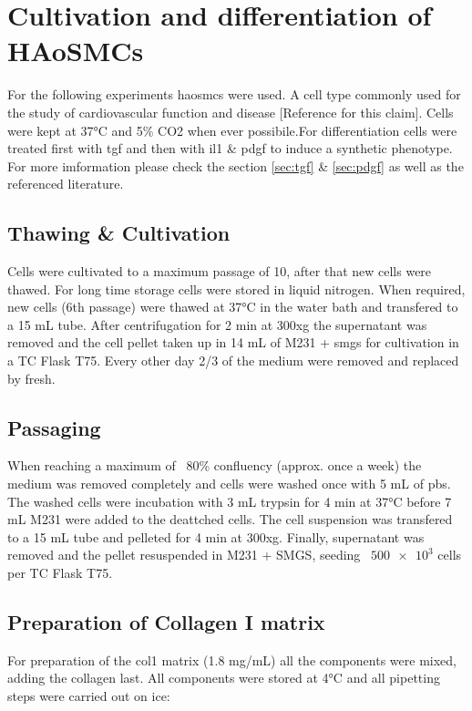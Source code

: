 \section{Cultivation and differentiation of HAoSMCs}
\label{sec:cultivation}
For the following experiments \acp{haosmc} were used. A cell type commonly used for the study of cardiovascular function and disease [Reference for this claim]. Cells were kept at 37°C and 5\% CO2 when ever possibile.For differentiation cells were treated first with \ac{tgf} and then with \ac{il1} \& \ac{pdgf} to induce a synthetic phenotype. For more imformation please check the section \ref{sec:tgf} \&  \ref{sec:pdgf} as well as the referenced literature.

    \subsection{Thawing \& Cultivation}
    Cells were cultivated to a maximum passage of 10, after that new cells were thawed. For long time storage cells were stored in liquid nitrogen. When required, new cells (6th passage) were thawed at 37°C in the water bath and transfered to a 15 mL tube. After centrifugation for 2 min at 300xg the supernatant was removed and the cell pellet taken up in 14 mL of M231 + \ac{smgs} for cultivation in a TC Flask T75. Every other day 2/3 of the medium were removed and replaced by fresh.

    \subsection{Passaging}
    When reaching a maximum of ~80\% confluency (approx. once a week) the medium was removed completely and cells were washed once with 5 mL of \ac{pbs}. The washed cells were incubation with 3 mL trypsin for 4 min at 37°C before 7 mL M231 were added to the deattched cells. The cell suspension was transfered to a 15 mL tube and pelleted for 4 min at 300xg. Finally, supernatant was removed and the pellet resuspended in M231 + SMGS, seeding ~$\num{500e3}$ cells per TC Flask T75.

    \subsection{Preparation of Collagen I matrix}
    For preparation of the \ac{col1} matrix (1.8 mg/mL) all the components were mixed, adding the collagen last. All components were stored at 4°C and all pipetting steps were carried out on ice:

